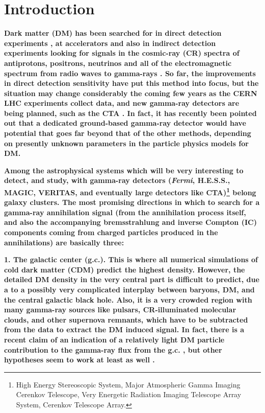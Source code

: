 \documentclass[10pt,aps,pra,reprint,amsmath,amsfonts,amssymb,showpacs,nofootinbib,floatfix]{revtex4-1}
\def\C#1{{\bf #1}}
\newcommand{\Fermi}{{\em Fermi}\xspace}
\begin{document}
\maketitle
\section{Introduction}

\C{Dark matter (DM) has been searched for in direct detection
  experiments \cite{Pato:2010zk}, at accelerators
  \cite{Ellis:2001hv,Baer:2006ff,Khachatryan:2011tk} and also in
  indirect detection experiments looking for signals in the cosmic-ray
  (CR) spectra of antiprotons, positrons, neutrinos and all of the
  electromagnetic spectrum from radio waves to gamma-rays
  \cite{Bergstrom:2009ib}. So far, the improvements in direct
  detection sensitivity have put this method into focus, but the
  situation may change considerably the coming few years as the CERN
  LHC experiments collect data, and new gamma-ray detectors are being
  planned, such as the CTA \cite{Consortium:2010bc}. In fact, it has
  recently been pointed out \cite{Bergstrom:2010gh} that a dedicated
  ground-based gamma-ray detector would have potential that goes far
  beyond that of the other methods, depending on presently unknown
  parameters in the particle physics models for DM.}

\C{Among the astrophysical systems which will be very interesting to
  detect, and study, with gamma-ray detectors (\Fermi, H.E.S.S.,
  MAGIC, VERITAS, and eventually large detectors like
  CTA)\footnote{{High Energy Stereoscopic System, Major Atmospheric
      Gamma Imaging Cerenkov Telescope, Very Energetic Radiation
      Imaging Telescope Array System, Cerenkov Telescope Array.}}
  belong galaxy clusters. The most promising directions in which to
  search for a gamma-ray annihilation signal (from the annihilation
  process itself, and also the accompanying bremsstrahlung and inverse
  Compton (IC) components coming from charged particles produced in
  the annihilations) are basically three:}

\C{1. The galactic center (g.c.). This is where all numerical
  simulations of cold dark matter (CDM) predict the highest
  density. However, the detailed DM density in the very central part
  is difficult to predict, due a to a possibly very complicated
  interplay between baryons, DM, and the central galactic black
  hole. Also, it is a very crowded region with many gamma-ray sources
  like pulsars, CR-illuminated molecular clouds, and other supernova
  remnants, which have to be subtracted from the data to extract the
  DM induced signal. In fact, there is a recent claim of an indication
  of a relatively light DM particle contribution to the gamma-ray flux
  from the g.c. \cite{2011PhLB..697..412H}, but other hypotheses seem
  to work at least as well \cite{2010arXiv1012.5839B}.}
\end{document}
